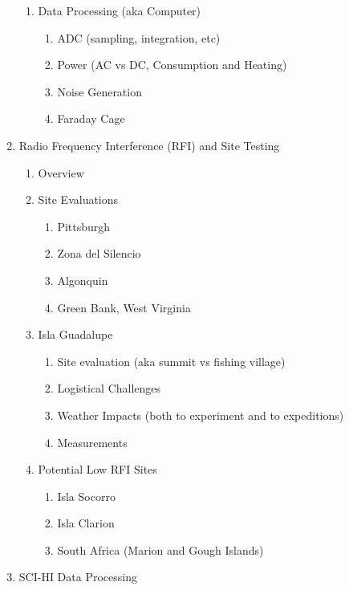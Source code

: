 \documentclass[12pt,twoside]{report}
\begin{document}
\begin{enumerate}
\begin{enumerate}
\item Data Processing (aka Computer)

\begin{enumerate}
\item ADC (sampling, integration, etc)
\item Power (AC vs DC, Consumption and Heating)
\item Noise Generation
\item Faraday Cage
\end{enumerate}

\end{enumerate}


\item Radio Frequency Interference (RFI) and Site Testing

\begin{enumerate}
\item Overview
\item Site Evaluations

\begin{enumerate}
\item Pittsburgh
\item Zona del Silencio
\item Algonquin 
\item Green Bank, West Virginia
\end{enumerate}

\item Isla Guadalupe

\begin{enumerate}
\item Site evaluation (aka summit vs fishing village)
\item Logistical Challenges
\item Weather Impacts (both to experiment and to expeditions)
\item Measurements 
\end{enumerate}

\item Potential Low RFI Sites

\begin{enumerate}
\item Isla Socorro
\item Isla Clarion
\item South Africa (Marion and Gough Islands)
\end{enumerate}

\end{enumerate}

\item SCI-HI Data Processing


\end{enumerate}
\end{document}
